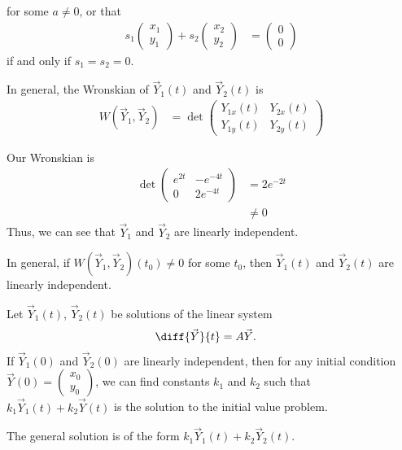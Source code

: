 \documentclass[10pt]{mypackage}
\begin{document}
\begin{example}
\begin{recall}
  for some $a \neq 0$, or that
  \begin{align*}
    s_1 \begin{pmatrix}x_1\\y_1\end{pmatrix}  + s_2 \begin{pmatrix}x_2\\y_2\end{pmatrix} &=  \begin{pmatrix}0\\0\end{pmatrix}
  \end{align*}
  if and only if $s_1 = s_2 = 0$.
\end{recall}
\begin{definition}[Wronskian]
  In general, the Wronskian of $\vec{Y}_1(t)$ and $\vec{Y}_2(t)$ is
  \begin{align*}
    W\left(\vec{Y}_1,\vec{Y}_2\right) &= \det \begin{pmatrix}Y_{1x}(t) & Y_{2x}(t) \\ Y_{1y}(t) & Y_{2y}(t)\end{pmatrix}
  \end{align*}
\end{definition}
Our Wronskian is
\begin{align*}
  \det \begin{pmatrix}e^{2t} & -e^{-4t} \\ 0 & 2e^{-4t}\end{pmatrix} &= 2e^{-2t}\\
                   &\neq 0
\end{align*}
Thus, we can see that $\vec{Y}_1$ and $\vec{Y}_2$ are linearly independent.\newline

In general, if $W\left(\vec{Y}_1,\vec{Y}_2\right)\left(t_0\right)\neq 0$ for some $t_0$, then $\vec{Y}_1(t)$ and $\vec{Y}_2(t)$ are linearly independent.
\end{example}
\begin{theorem}
  Let $\vec{Y}_1(t)$, $\vec{Y}_2(t)$ be solutions of the linear system
  \begin{align*}
    \diff{\vec{Y}}{t} &= A\vec{Y}.
  \end{align*}
  If $\vec{Y}_1(0)$ and $\vec{Y}_2(0)$ are linearly independent, then for any initial condition $\vec{Y}\left(0\right) = \begin{pmatrix}x_0\\y_0\end{pmatrix}$, we can find constants $k_1$ and $k_2$ such that $k_1\vec{Y}_1\left(t\right) + k_2\vec{Y}(t)$ is the solution to the initial value problem.\newline

  The general solution is of the form $k_1\vec{Y}_1(t) + k_2\vec{Y}_2(t)$.
\end{theorem}
\end{document}
